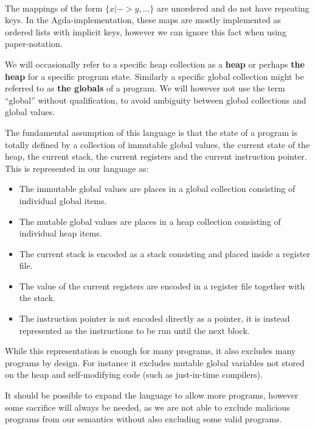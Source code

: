 \paragraph{}
The mappings of the form $\{x |-> y, \dots\}$ are unordered and do not have
repeating keys. In the Agda-implementation, these maps are mostly implemented as
ordered lists with implicit keys, however we can ignore this fact when using
paper-notation.

We will occasionally refer to a specific heap collection as a \textbf{heap} or
perhaps \textbf{the heap} for a specific program state. Similarly a specific
global collection might be referred to as \textbf{the globals} of a program. We
will however not use the term ``global'' without qualification, to avoid
ambiguity between global collections and global values.

The fundamental assumption of this language is that the state of a program is
totally defined by a collection of immutable global values, the current state of
the heap, the current stack, the current registers and the current instruction
pointer. This is represented in our language as:

\begin{itemize}
\item The immutable global values are places in a global collection
  consisting of individual global items.
\item The mutable global values are places in a heap collection
  consisting of individual heap items.
\item The current stack is encoded as a stack consisting and placed inside a
  register file.
\item The value of the current registers are encoded in a register file together
  with the stack.
\item The instruction pointer is not encoded directly as a pointer, it is
  instead represented as the instructions to be run until the next block.
\end{itemize}

While this representation is enough for many programs, it also excludes many
programs by design. For instance it excludes mutable global variables not stored
on the heap and self-modifying code (such as just-in-time compilers).

It should be possible to expand the language to allow more programs, however
some sacrifice will always be needed, as we are not able to exclude malicious
programs from our semantics without also excluding some valid programs.
